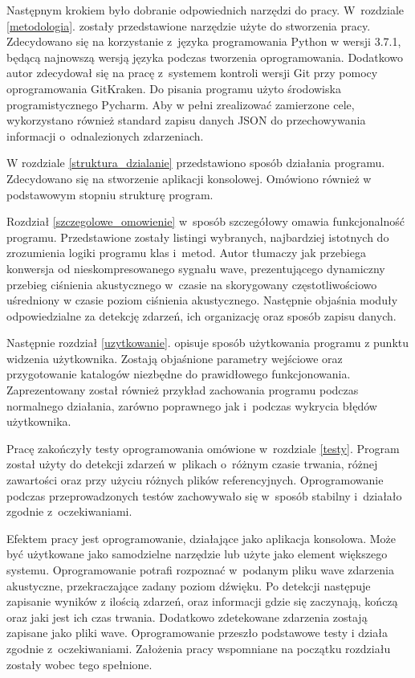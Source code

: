 \documentclass[eng,printmode]{mgr}
\begin{document}
Następnym krokiem było dobranie odpowiednich narzędzi do pracy. W~rozdziale \ref{metodologia}. zostały przedstawione narzędzie użyte do stworzenia pracy. Zdecydowano się na korzystanie z~języka programowania Python w wersji 3.7.1, będącą najnowszą wersją języka podczas tworzenia oprogramowania. Dodatkowo autor zdecydował się na pracę z~systemem kontroli wersji Git przy pomocy oprogramowania GitKraken. Do pisania programu użyto środowiska programistycznego Pycharm. Aby w pełni zrealizować zamierzone cele, wykorzystano również standard zapisu danych JSON do przechowywania informacji o~odnalezionych zdarzeniach. 

W rozdziale \ref{struktura_dzialanie} przedstawiono sposób działania programu. Zdecydowano się na stworzenie aplikacji konsolowej. Omówiono również w podstawowym stopniu strukturę program.
 

Rozdział \ref{szczegolowe_omowienie} w~sposób szczegółowy omawia funkcjonalność programu. Przedstawione zostały listingi wybranych, najbardziej istotnych do zrozumienia logiki programu klas i~metod. Autor tłumaczy jak przebiega konwersja od nieskompresowanego sygnału wave, prezentującego dynamiczny przebieg ciśnienia akustycznego w~czasie na skorygowany częstotliwościowo uśredniony w czasie poziom ciśnienia akustycznego. Następnie objaśnia moduły odpowiedzialne za detekcję zdarzeń, ich organizację oraz sposób zapisu danych. 

Następnie rozdział \ref{uzytkowanie}. opisuje sposób użytkowania programu z punktu widzenia użytkownika. Zostają objaśnione parametry wejściowe oraz przygotowanie katalogów niezbędne do prawidłowego funkcjonowania. Zaprezentowany został również przykład zachowania programu podczas normalnego działania, zarówno poprawnego jak i~podczas wykrycia błędów użytkownika. 

Pracę zakończyły testy oprogramowania omówione w~rozdziale \ref{testy}. Program został użyty do detekcji zdarzeń w~plikach o~różnym czasie trwania, różnej zawartości oraz przy użyciu różnych plików referencyjnych. Oprogramowanie podczas przeprowadzonych testów zachowywało się w~sposób stabilny i~działało zgodnie z~oczekiwaniami. 

Efektem pracy jest oprogramowanie, działające jako aplikacja konsolowa. Może być użytkowane jako samodzielne narzędzie lub użyte jako element większego systemu. Oprogramowanie potrafi rozpoznać w~podanym pliku wave zdarzenia akustyczne, przekraczające zadany poziom dźwięku. Po detekcji następuje zapisanie wyników z ilością zdarzeń, oraz informacji gdzie się zaczynają, kończą oraz jaki jest ich czas trwania. Dodatkowo zdetekowane zdarzenia zostają zapisane jako pliki wave. Oprogramowanie przeszło podstawowe testy i działa zgodnie z~oczekiwaniami. Założenia pracy wspomniane na początku rozdziału zostały wobec tego spełnione.
\end{document}
